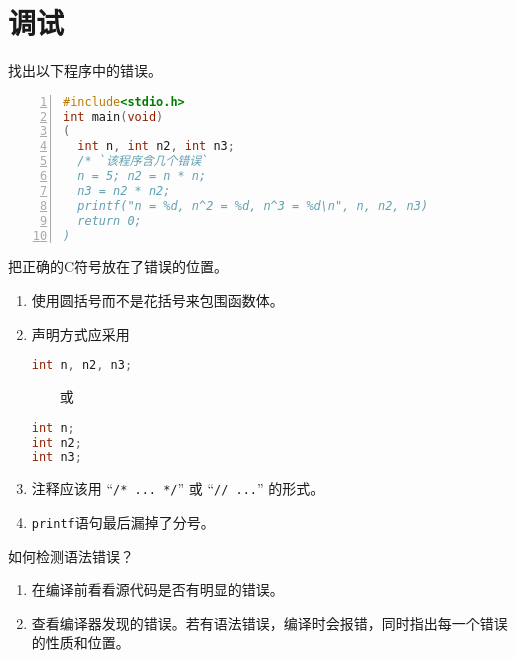 \section{调试}
\begin{frame}[fragile]
找出以下程序中的错误。
\begin{lstlisting}[language=c,numbers=left,frame=tb]
#include<stdio.h>
int main(void) 
(
  int n, int n2, int n3;
  /* `该程序含几个错误`    
  n = 5; n2 = n * n;
  n3 = n2 * n2;
  printf("n = %d, n^2 = %d, n^3 = %d\n", n, n2, n3)	 
  return 0;
)
\end{lstlisting}
\end{frame}

\begin{frame}[fragile]
\begin{dingyi}[语法错误] 
把正确的C符号放在了错误的位置。
\end{dingyi}\pause 

\begin{enumerate}
\item 使用圆括号而不是花括号来包围函数体。\\[0.1in]
\item 声明方式应采用

\begin{minipage}{0.4\linewidth}
\begin{lstlisting}[language=c,frame=single]
int n, n2, n3;
\end{lstlisting}
\end{minipage}
~~~~或~~~~
\begin{minipage}{0.4\linewidth}
\begin{lstlisting}[language=c,frame=single]
int n;
int n2;
int n3;
\end{lstlisting}
\end{minipage}
\item 注释应该用 “\lstinline|/* ... */|” 或 “\lstinline|// ...|” 的形式。\\[0.1in]
\item \lstinline|printf|语句最后漏掉了分号。
\end{enumerate}
\end{frame}

\begin{frame}[fragile]
\begin{wenti}
如何检测语法错误？
\end{wenti}\pause 

\begin{enumerate}
\item 在编译前看看源代码是否有明显的错误。\\[0.1in]
\item 查看编译器发现的错误。若有语法错误，编译时会报错，同时指出每一个错误的性质和位置。
\end{enumerate}

\end{frame}


